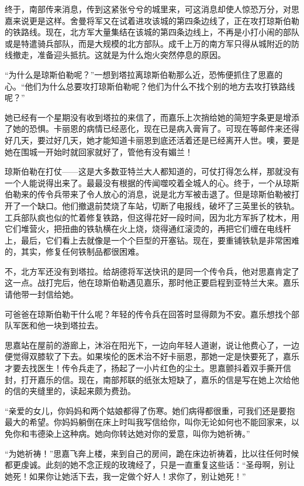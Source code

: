 \par 终于，南部传来消息，传到这紧张兮兮的城里来，可这消息却使人惊恐万分，对思嘉来说更是这样。舍曼将军又在试着进攻该城的第四条边线了，正在攻打琼斯伯勒的铁路线。现在，北方军大量集结在该城的第四条边线上，不再是小打小闹的部队或是特遣骑兵部队，而是大规模的北方部队。成千上万的南方军只得从城附近的防线撤走，准备迎头抵抗。这就是为什么炮火突然停息的原因。
\par “为什么是琼斯伯勒呢？”一想到塔拉离琼斯伯勒那么近，恐怖便抓住了思嘉的心。“他们为什么总要攻打琼斯伯勒呢？他们为什么不找个别的地方去攻打铁路线呢？”
\par 她已经有一个星期没有收到塔拉的来信了，而嘉乐上次捎给她的简短字条更是增添了她的恐惧。卡丽恩的病情已经恶化，现在已是病入膏肓了。可现在等邮件来还得好几天，要过好几天，她才能知道卡丽恩到底还活着还是已经离开人世。噢，要是她在围城一开始时就回家就好了，管他有没有媚兰！
\par 琼斯伯勒在打仗——这是大多数亚特兰大人都知道的，可仗打得怎么样，那就没有一个人能说得出来了。最最没有根据的传闻噬咬着全城人的心。终于，一个从琼斯伯勒来的传令兵带来了令人放心的消息，说是北方军被击退了。但是琼斯伯勒被打开了一个缺口。他们撤退前焚烧了车站，切断了电报线，破坏了三英里长的铁轨。工兵部队疯也似的忙着修复铁路，但这得花好一段时间，因为北方军拆了枕木，用它们堆营火，把扭曲的铁轨横在火上烧，烧得通红滚烫的，再把它们缠在电线杆上，最后，它们看上去就像是一个个巨型的开塞钻。现在，要重铺铁轨是非常困难的，其实，修复任何铁制品都很困难。
\par 不，北方军还没有到塔拉。给胡德将军送快讯的是同一个传令兵，他对思嘉肯定了这一点。战打完后，他在琼斯伯勒遇见嘉乐，那时他正要启程到亚特兰大来。嘉乐请他带一封信给她。
\par 可爸爸在琼斯伯勒干什么呢？年轻的传令兵在回答时显得颇为不安。嘉乐想找个部队军医和他一块到塔拉去。
\par 思嘉站在屋前的游廊上，沐浴在阳光下，一边向年轻人道谢，说让他费心了，一边便觉得双膝软了下去。如果埃伦的医术治不好卡丽恩，那她一定是快要死了，嘉乐才要去找医生！传令兵走了，扬起了一小片红色的尘土。思嘉颤抖着双手撕开信封，打开嘉乐的信。现在，南部邦联的纸张太短缺了，嘉乐的信是写在她上次给他的信的夹缝里的，读起来颇为费劲。
\par “亲爱的女儿，你妈妈和两个姑娘都得了伤寒。她们病得都很重，可我们还是要抱最大的希望。你妈妈躺倒在床上时叫我写信给你，叫你无论如何也不能回家来，以免你和韦德染上这种病。她向你转达她对你的爱意，叫你为她祈祷。”
\par “为她祈祷！”思嘉飞奔上楼，来到自己的房间，跪在床边祈祷着，比以往任何时候都更虔诚。此刻的她不念正规的玫瑰经了，只是一直重复这些话：“圣母啊，别让她死！如果你让她活下去，我一定做个好人！求你了，别让她死！”
